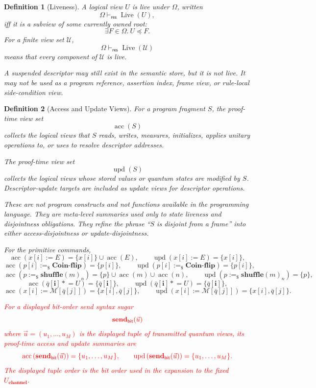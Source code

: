 \documentclass[acmsmall,screen,review,anonymous,nonacm]{acmart}
\newtheorem{definition}{Definition}[section]
\theoremstyle{defn_style}
\newcommand{\asteq}{\mathrel{*}=}
\begin{document}
\begin{definition}[Liveness]
A logical view \(U\) is live under \(\Omega\), written
\[
\Omega\vdash_{\mathsf{res}}\operatorname{Live}(U),
\]
iff it is a subview of some currently owned root:
\[
\exists F\in\Omega.\ U\preceq F.
\]
For a finite view set \(\mathcal U\),
\[
\Omega\vdash_{\mathsf{res}}\operatorname{Live}(\mathcal U)
\]
means that every component of \(\mathcal U\) is live.

A suspended descriptor may still exist in the semantic store, but it is not
live. It may not be used as a program reference, assertion index, frame view,
or rule-local side-condition view.
\end{definition}

\begin{definition}[Access and Update Views]
For a program fragment \(S\), the proof-time view set
\[
\operatorname{acc}(S)
\]
collects the logical views that \(S\) reads, writes, measures, initializes,
applies unitary operations to, or uses to resolve descriptor addresses.

The proof-time view set
\[
\operatorname{upd}(S)
\]
collects the logical views whose stored values or quantum states are modified
by \(S\). Descriptor-update targets are included as update views for descriptor
operations.

These are not program constructs and not functions available in the programming
language. They are meta-level summaries used only to state liveness and
disjointness obligations. They refine the phrase ``\(S\) is disjoint from a
frame'' into either access-disjointness or update-disjointness.

For the primitive commands,
\[
\operatorname{acc}(x[i]:=E)=\{x[i]\}\cup\operatorname{acc}(E),
\qquad
\operatorname{upd}(x[i]:=E)=\{x[i]\},
\]
\[
\operatorname{acc}(p[i]:=_\$\mathbf{Coin\mbox{-}flip})=\{p[i]\},
\qquad
\operatorname{upd}(p[i]:=_\$\mathbf{Coin\mbox{-}flip})=\{p[i]\},
\]
\[
\operatorname{acc}(p:=_\$\mathbf{shuffle}(m)_n)=
\{p\}\cup\operatorname{acc}(m)\cup\operatorname{acc}(n),
\qquad
\operatorname{upd}(p:=_\$\mathbf{shuffle}(m)_n)=\{p\},
\]
\[
\operatorname{acc}(\bar q[\mathbf i]\asteq U)=\{\bar q[\mathbf i]\},
\qquad
\operatorname{upd}(\bar q[\mathbf i]\asteq U)=\{\bar q[\mathbf i]\},
\]
\[
\operatorname{acc}(x[i]:=\mathcal M[\bar q[j]])
=
\{x[i],\bar q[j]\},
\qquad
\operatorname{upd}(x[i]:=\mathcal M[\bar q[j]])
=
\{x[i],\bar q[j]\}.
\]

\textcolor{red}{For a displayed bit-order send syntax sugar}
\[\textcolor{red}{\mathbf{send}_{\mathsf{bit}}(\vec u)}\]\textcolor{red}{where \(\vec u=(u_1,\ldots,u_M)\) is the displayed tuple of transmitted quantum views, its proof-time access and update summaries are}\[\textcolor{red}{\operatorname{acc}\left(\mathbf{send}_{\mathsf{bit}}(\vec u)\right)=\{u_1,\ldots,u_M\},\qquad\operatorname{upd}\left(\mathbf{send}_{\mathsf{bit}}(\vec u)\right)=\{u_1,\ldots,u_M\}.}
\]
\textcolor{red}{The displayed tuple order is the bit order used in the expansion to the fixed \(U_{\textbf{channel}}\).}


\end{definition}
\end{document}
